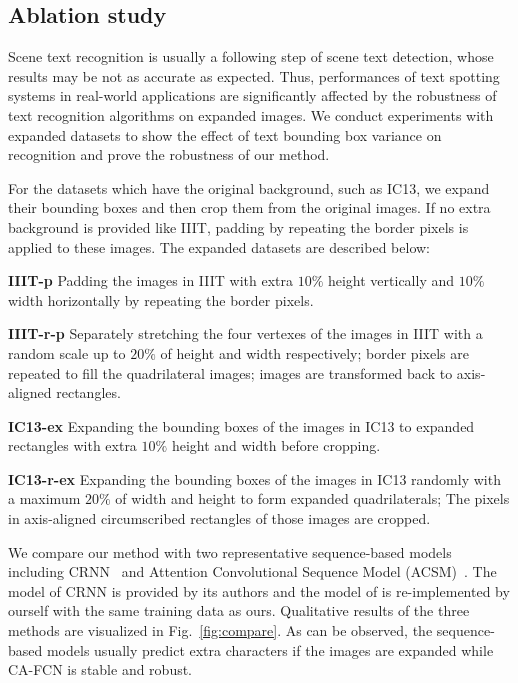 \documentclass[letterpaper]{article} \usepackage{aaai19}  \usepackage{times}  \usepackage{helvet}  \usepackage{courier}  \usepackage{url}  \usepackage{graphicx}  \frenchspacing  \usepackage{multirow}
\begin{document}
\subsection{Ablation study}\label{sec:expanding}
Scene text recognition is usually a following step of scene text detection, whose results may be not as accurate as expected. Thus, performances of text spotting systems in real-world applications are significantly affected by the robustness of text recognition algorithms on expanded images. We conduct experiments with expanded datasets to show the effect of text bounding box variance on recognition and prove the robustness of our method.

For the datasets which have the original background, such as IC13, we expand their bounding boxes and then crop them from the original images. If no extra background is provided like IIIT, padding by repeating the border pixels is applied to these images. The expanded datasets are described below:

\noindent\textbf{IIIT-p}
Padding the images in IIIT with extra $10\%$ height vertically and $10\%$ width horizontally by repeating the border pixels.

\noindent\textbf{IIIT-r-p}
Separately stretching the four vertexes of the images in IIIT with a random scale up to $20\%$ of height and width respectively; border pixels are repeated to fill the quadrilateral images; images are transformed back to axis-aligned rectangles.

\noindent\textbf{IC13-ex}
Expanding the bounding boxes of the images in IC13 to expanded rectangles with extra $10\%$ height and width before cropping.

\noindent\textbf{IC13-r-ex}
Expanding the bounding boxes of the images in IC13 randomly with a maximum $20\%$ of width and height to form expanded quadrilaterals; The pixels in axis-aligned circumscribed rectangles of those images are cropped.

We compare our method with two representative sequence-based models including CRNN~\cite{DBLP:journals/pami/ShiBY17} and Attention Convolutional Sequence Model (ACSM)~\cite{DBLP:journals/corr/gao}. 
The model of CRNN is provided by its authors and the model of \cite{DBLP:journals/corr/gao} is re-implemented by ourself with the same training data as ours.
Qualitative results of the three methods are visualized in Fig.~\ref{fig:compare}. As can be observed, the sequence-based models usually predict extra characters if the images are expanded while CA-FCN is stable and robust. 
\end{document}
